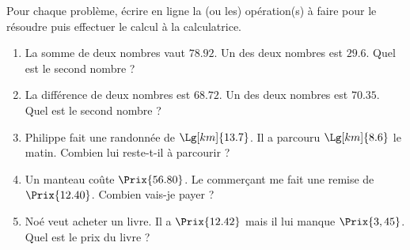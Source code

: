 \begin{exercice}
    Pour chaque problème, écrire en ligne la (ou les) opération(s) à faire pour le résoudre puis effectuer le calcul à la calculatrice.
    \begin{enumerate}
       \item La somme de deux nombres vaut $\num{78.92}$. Un des deux nombres est $\num{29.6}$. Quel est le second nombre ?
       \item La différence de deux nombres est $\num{68.72}$. Un des deux nombres est $\num{70.35}$. Quel est le second nombre ?
       \item Philippe fait une randonnée de $\Lg[km]{13.7}$. Il a parcouru $\Lg[km]{8.6}$ le matin.
        Combien lui reste-t-il à parcourir ?
       \item Un manteau coûte $\Prix{56.80}$. Le commerçant me fait une remise de $\Prix{12.40}$. Combien vais-je payer ?
       \item Noé veut acheter un livre. Il a $\Prix{12.42}$ mais il lui manque $\Prix{3,45}$. Quel est le prix du livre ?   
    \end{enumerate}
\end{exercice}
